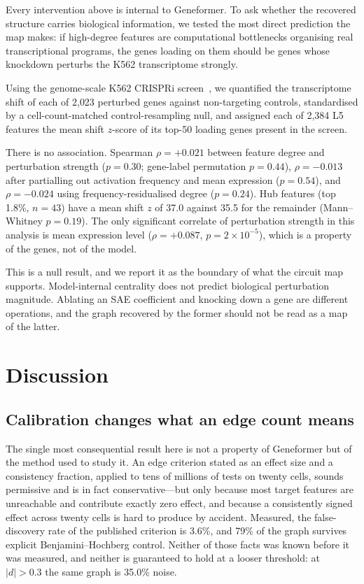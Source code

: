\documentclass[11pt,onecolumn]{article}
\begin{document}
Every intervention above is internal to Geneformer. To ask whether the recovered structure carries biological information, we tested the most direct prediction the map makes: if high-degree features are computational bottlenecks organising real transcriptional programs, the genes loading on them should be genes whose knockdown perturbs the K562 transcriptome strongly.

Using the genome-scale K562 CRISPRi screen~\citep{replogle2022mapping}, we quantified the transcriptome shift of each of 2{,}023 perturbed genes against non-targeting controls, standardised by a cell-count-matched control-resampling null, and assigned each of 2{,}384 L5 features the mean shift $z$-score of its top-50 loading genes present in the screen.

There is no association. Spearman $\rho=+0.021$ between feature degree and perturbation strength ($p=0.30$; gene-label permutation $p=0.44$), $\rho=-0.013$ after partialling out activation frequency and mean expression ($p=0.54$), and $\rho=-0.024$ using frequency-residualised degree ($p=0.24$). Hub features (top 1.8\%, $n=43$) have a mean shift $z$ of 37.0 against 35.5 for the remainder (Mann--Whitney $p=0.19$). The only significant correlate of perturbation strength in this analysis is mean expression level ($\rho=+0.087$, $p=2\times10^{-5}$), which is a property of the genes, not of the model.

This is a null result, and we report it as the boundary of what the circuit map supports. Model-internal centrality does not predict biological perturbation magnitude. Ablating an SAE coefficient and knocking down a gene are different operations, and the graph recovered by the former should not be read as a map of the latter.

\section{Discussion}
\label{sec:discussion}

\subsection{Calibration changes what an edge count means}

The single most consequential result here is not a property of Geneformer but of the method used to study it. An edge criterion stated as an effect size and a consistency fraction, applied to tens of millions of tests on twenty cells, sounds permissive and is in fact conservative---but only because most target features are unreachable and contribute exactly zero effect, and because a consistently signed effect across twenty cells is hard to produce by accident. Measured, the false-discovery rate of the published criterion is 3.6\%, and 79\% of the graph survives explicit Benjamini--Hochberg control. Neither of those facts was known before it was measured, and neither is guaranteed to hold at a looser threshold: at $|d|>0.3$ the same graph is 35.0\% noise.
\end{document}

